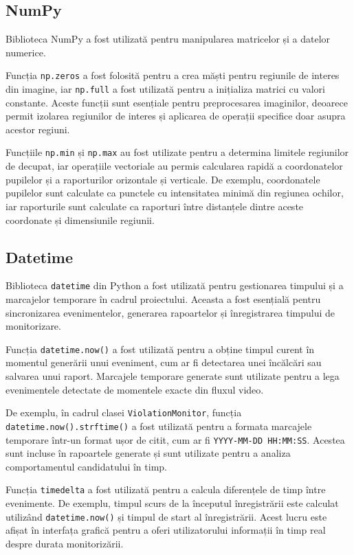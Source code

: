 \documentclass[12pt,a4paper]{article}
\begin{document}
\subsection{NumPy}
Biblioteca NumPy a fost utilizată pentru manipularea matricelor și a datelor numerice\cite{harris2020array}. 

Funcția \texttt{np.zeros} a fost folosită pentru a crea măști pentru regiunile de interes din imagine, iar \texttt{np.full} a fost utilizată pentru a inițializa matrici cu valori constante. Aceste funcții sunt esențiale pentru preprocesarea imaginilor, deoarece permit izolarea regiunilor de interes și aplicarea de operații specifice doar asupra acestor regiuni\cite{goodfellow2016deep}.

Funcțiile \texttt{np.min} și \texttt{np.max} au fost utilizate pentru a determina limitele regiunilor de decupat, iar operațiile vectoriale au permis calcularea rapidă a coordonatelor pupilelor și a raporturilor orizontale și verticale. De exemplu, coordonatele pupilelor sunt calculate ca punctele cu intensitatea minimă din regiunea ochilor, iar raporturile sunt calculate ca raporturi între distanțele dintre aceste coordonate și dimensiunile regiunii.

\subsection{Datetime}
Biblioteca \texttt{datetime}\cite{pythondatetime} din Python a fost utilizată pentru gestionarea timpului și a marcajelor temporare în cadrul proiectului. Aceasta a fost esențială pentru sincronizarea evenimentelor, generarea rapoartelor și înregistrarea timpului de monitorizare.

Funcția \texttt{datetime.now()} a fost utilizată pentru a obține timpul curent în momentul generării unui eveniment, cum ar fi detectarea unei încălcări sau salvarea unui raport. Marcajele temporare generate sunt utilizate pentru a lega evenimentele detectate de momentele exacte din fluxul video.

De exemplu, în cadrul clasei \texttt{ViolationMonitor}, funcția \texttt{datetime.now().strftime()} a fost utilizată pentru a formata marcajele temporare într-un format ușor de citit, cum ar fi \texttt{YYYY-MM-DD HH:MM:SS}. Acestea sunt incluse în rapoartele generate și sunt utilizate pentru a analiza comportamentul candidatului în timp.

Funcția \texttt{timedelta} a fost utilizată pentru a calcula diferențele de timp între evenimente. De exemplu, timpul scurs de la începutul înregistrării este calculat utilizând \texttt{datetime.now()} și timpul de start al înregistrării. Acest lucru este afișat în interfața grafică pentru a oferi utilizatorului informații în timp real despre durata monitorizării.
\end{document}
